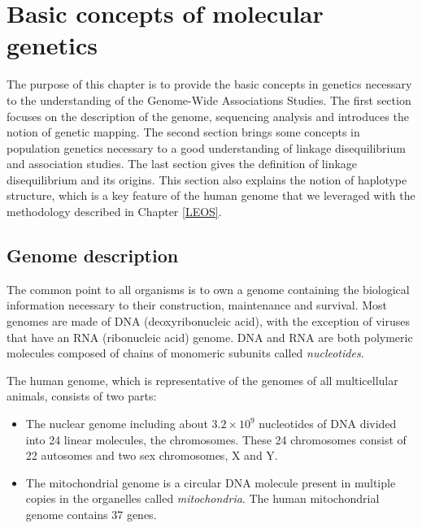 \documentclass[]{book}
\begin{document}
\hypertarget{basic-concepts-of-molecular-genetics}{%
\chapter{Basic concepts of molecular genetics}\label{basic-concepts-of-molecular-genetics}}

The purpose of this chapter is to provide the basic concepts in genetics necessary to the understanding of the Genome-Wide Associations Studies. The first section focuses on the description of the genome, sequencing analysis and introduces the notion of genetic mapping. The second section brings some concepts in population genetics necessary to a good understanding of linkage disequilibrium and association studies. The last section gives the definition of linkage disequilibrium and its origins. This section also explains the notion of haplotype structure, which is a key feature of the human genome that we leveraged with the methodology described in Chapter \ref{LEOS}.

\hypertarget{genome}{%
\section{Genome description}\label{genome}}

The common point to all organisms is to own a genome containing the
biological information necessary to their construction, maintenance and
survival. Most genomes are made of DNA (deoxyribonucleic acid), with the
exception of viruses that have an RNA (ribonucleic acid) genome. DNA and
RNA are both polymeric molecules composed of chains of monomeric
subunits called \emph{nucleotides}.

The human genome, which is representative of the genomes of all
multicellular animals, consists of two parts:

\begin{itemize}
\item
  The nuclear genome including about \(3.2 \times 10^9\) nucleotides of
  DNA divided into 24 linear molecules, the chromosomes. These 24
  chromosomes consist of 22 autosomes and two sex chromosomes, X
  and Y.
\item
  The mitochondrial genome is a circular DNA molecule present in
  multiple copies in the organelles called \emph{mitochondria}. The human
  mitochondrial genome contains 37 genes.
\end{itemize}
\end{document}
